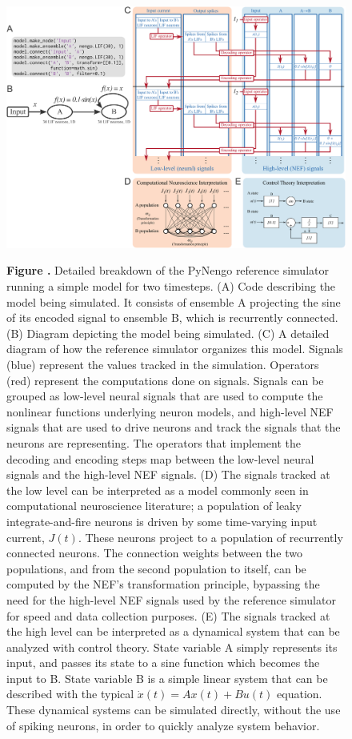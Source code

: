 \documentclass{frontiersSCNS}
\begin{document}
\begin{figure}
\begin{center}
  \includegraphics[width=\textwidth]{sim}
\end{center}
 \textbf{\label{fig:sim} Figure .}{
   Detailed breakdown of the PyNengo reference simulator
   running a simple model for two timesteps.
   (A) Code describing the model being simulated.
   It consists of ensemble A projecting the sine of its
   encoded signal to ensemble B,
   which is recurrently connected.
   (B) Diagram depicting the model being simulated.
   (C) A detailed diagram of how the reference simulator
   organizes this model. Signals (blue) represent the values
   tracked in the simulation.
   Operators (red) represent the computations done on signals.
   Signals can be grouped as low-level neural signals
   that are used to compute the nonlinear functions
   underlying neuron models,
   and high-level NEF signals that are used to
   drive neurons and track the signals
   that the neurons are representing.
   The operators that implement the decoding
   and encoding steps map between
   the low-level neural signals
   and the high-level NEF signals.
   (D) The signals tracked at the low level
   can be interpreted as a model
   commonly seen in computational neuroscience literature;
   a population of leaky integrate-and-fire neurons
   is driven by some time-varying input current, $J(t)$.
   These neurons project to a population
   of recurrently connected neurons.
   The connection weights between the two populations,
   and from the second population to itself,
   can be computed by the NEF's transformation
   principle, bypassing the need for
   the high-level NEF signals
   used by the reference simulator
   for speed and data collection purposes.
   (E) The signals tracked at the high level
   can be interpreted as a dynamical system
   that can be analyzed with control theory.
   State variable A simply represents its input,
   and passes its state to a sine function
   which becomes the input to B.
   State variable B is a simple linear system
   that can be described with the typical
   $\dot{x}(t) = A x(t) + B u(t)$ equation.
   These dynamical systems can be simulated
   directly, without the use of spiking neurons,
   in order to quickly analyze system behavior.}
\end{figure}
\end{document}

